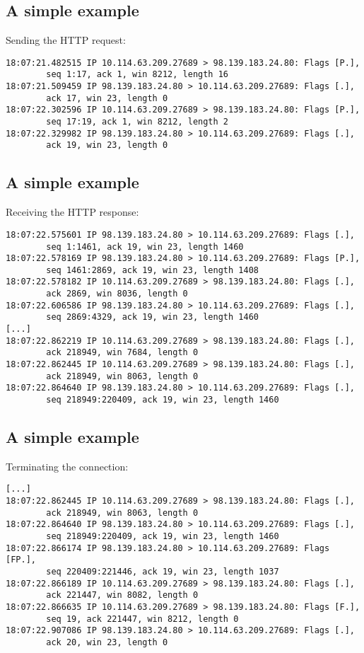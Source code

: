 \documentclass[xga]{xdvislides}
\begin{document}
\subsection{A simple example}
Sending the HTTP request:
\begin{verbatim}
18:07:21.482515 IP 10.114.63.209.27689 > 98.139.183.24.80: Flags [P.],
        seq 1:17, ack 1, win 8212, length 16
18:07:21.509459 IP 98.139.183.24.80 > 10.114.63.209.27689: Flags [.],
        ack 17, win 23, length 0
18:07:22.302596 IP 10.114.63.209.27689 > 98.139.183.24.80: Flags [P.],
        seq 17:19, ack 1, win 8212, length 2
18:07:22.329982 IP 98.139.183.24.80 > 10.114.63.209.27689: Flags [.],
        ack 19, win 23, length 0
\end{verbatim}

\subsection{A simple example}
Receiving the HTTP response:
\begin{verbatim}
18:07:22.575601 IP 98.139.183.24.80 > 10.114.63.209.27689: Flags [.],
        seq 1:1461, ack 19, win 23, length 1460
18:07:22.578169 IP 98.139.183.24.80 > 10.114.63.209.27689: Flags [P.],
        seq 1461:2869, ack 19, win 23, length 1408
18:07:22.578182 IP 10.114.63.209.27689 > 98.139.183.24.80: Flags [.],
        ack 2869, win 8036, length 0
18:07:22.606586 IP 98.139.183.24.80 > 10.114.63.209.27689: Flags [.],
        seq 2869:4329, ack 19, win 23, length 1460
[...]
18:07:22.862219 IP 10.114.63.209.27689 > 98.139.183.24.80: Flags [.],
        ack 218949, win 7684, length 0
18:07:22.862445 IP 10.114.63.209.27689 > 98.139.183.24.80: Flags [.],
        ack 218949, win 8063, length 0
18:07:22.864640 IP 98.139.183.24.80 > 10.114.63.209.27689: Flags [.],
        seq 218949:220409, ack 19, win 23, length 1460
\end{verbatim}

\subsection{A simple example}
Terminating the connection:
\begin{verbatim}
[...]
18:07:22.862445 IP 10.114.63.209.27689 > 98.139.183.24.80: Flags [.],
        ack 218949, win 8063, length 0
18:07:22.864640 IP 98.139.183.24.80 > 10.114.63.209.27689: Flags [.],
        seq 218949:220409, ack 19, win 23, length 1460
18:07:22.866174 IP 98.139.183.24.80 > 10.114.63.209.27689: Flags [FP.],
        seq 220409:221446, ack 19, win 23, length 1037
18:07:22.866189 IP 10.114.63.209.27689 > 98.139.183.24.80: Flags [.],
        ack 221447, win 8082, length 0
18:07:22.866635 IP 10.114.63.209.27689 > 98.139.183.24.80: Flags [F.],
        seq 19, ack 221447, win 8212, length 0
18:07:22.907086 IP 98.139.183.24.80 > 10.114.63.209.27689: Flags [.],
        ack 20, win 23, length 0
\end{verbatim}
\end{document}
